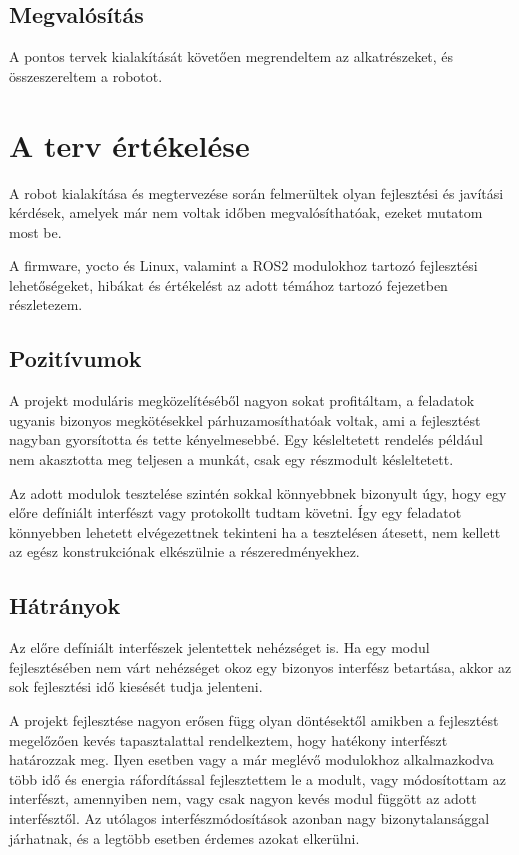 \subsection{Megvalósítás}

A pontos tervek kialakítását követően megrendeltem az alkatrészeket, és
összeszereltem a robotot.

\section{A terv értékelése}

A robot kialakítása és megtervezése során felmerültek olyan fejlesztési és
javítási kérdések, amelyek már nem voltak időben megvalósíthatóak, ezeket mutatom
most be.

A firmware, yocto és Linux, valamint a ROS2 modulokhoz tartozó fejlesztési
lehetőségeket, hibákat és értékelést az adott témához tartozó fejezetben
részletezem.

\subsection{Pozitívumok}

A projekt moduláris megközelítéséből nagyon sokat profitáltam, a feladatok
ugyanis bizonyos megkötésekkel párhuzamosíthatóak voltak, ami a fejlesztést
nagyban gyorsította és tette kényelmesebbé. Egy késleltetett rendelés például nem
akasztotta meg teljesen a munkát, csak egy részmodult késleltetett.

\medskip

Az adott modulok tesztelése szintén sokkal könnyebbnek bizonyult úgy, hogy egy
előre defíniált interfészt vagy protokollt tudtam követni. Így egy feladatot
könnyebben lehetett elvégezettnek tekinteni ha a tesztelésen átesett, nem kellett
az egész konstrukciónak elkészülnie a részeredményekhez. 

\subsection{Hátrányok}

Az előre defíniált interfészek jelentettek nehézséget is. Ha egy modul
fejlesztésében nem várt nehézséget okoz egy bizonyos interfész betartása, akkor
az sok fejlesztési idő kiesését tudja jelenteni.

A projekt fejlesztése nagyon erősen függ olyan döntésektől amikben a fejlesztést
megelőzően kevés tapasztalattal rendelkeztem, hogy hatékony interfészt határozzak
meg. Ilyen esetben vagy a már meglévő modulokhoz alkalmazkodva több idő és
energia ráfordítással fejlesztettem le a modult, vagy módosítottam az interfészt,
amennyiben nem, vagy csak nagyon kevés modul függött az adott interfésztől. Az
utólagos interfészmódosítások azonban nagy bizonytalansággal járhatnak, és a
legtöbb esetben érdemes azokat elkerülni.

